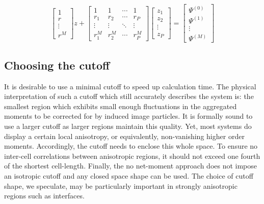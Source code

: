 \documentclass[
journal=jctcce,
manuscript=letter]{achemso}
\begin{document}
\begin{equation}
\label{eq:finalMatrix_mom}
\begin{bmatrix}
       1    \\[0.3em]
       r  \\[0.3em]
       \vdots          \\[0.3em]
       r^{M}      
     \end{bmatrix}z + \begin{bmatrix}  
  1 & 1 & \cdots & 1 \\
  r_1 & r_2 & \cdots & r_P \\
  \vdots  & \vdots  & \ddots & \vdots  \\
  r_1^{M} & r_2^{M} & \cdots & r_P^{M}
     \end{bmatrix}
     \begin{bmatrix}
       z_{1}    \\[0.3em]
       z_{2}  \\[0.3em]
       \vdots          \\[0.3em]
       z_{P} 
     \end{bmatrix}
     = \begin{bmatrix}
       \Psi^{(0)}    \\[0.3em]
       \Psi^{(1)}  \\[0.3em]
       \vdots          \\[0.3em]
       \Psi^{(M)}      
     \end{bmatrix}
\end{equation}

\subsection{Choosing the cutoff}
\label{sec:cutoff}
It is desirable to use a minimal cutoff to speed up calculation time. The physical interpretation of such a cutoff which still accurately describes the system is: the smallest region which exhibits small enough fluctuations in the aggregated moments to be corrected for by induced image particles. It is formally sound to use a larger cutoff as larger regions maintain this quality.
Yet, most systems do display a certain local anisotropy, or equivalently, non-vanishing higher order moments.
Accordingly, the cutoff needs to enclose this whole space. To ensure no inter-cell correlations between anisotropic regions, it should not exceed one fourth of the shortest cell-length\cite{stenqvist2018replicate}.
Finally, the no net-moment approach does not impose an isotropic cutoff and any closed space shape can be used. The choice of cutoff shape, we speculate, may be particularly important in strongly anisotropic regions such as interfaces.
\end{document}
